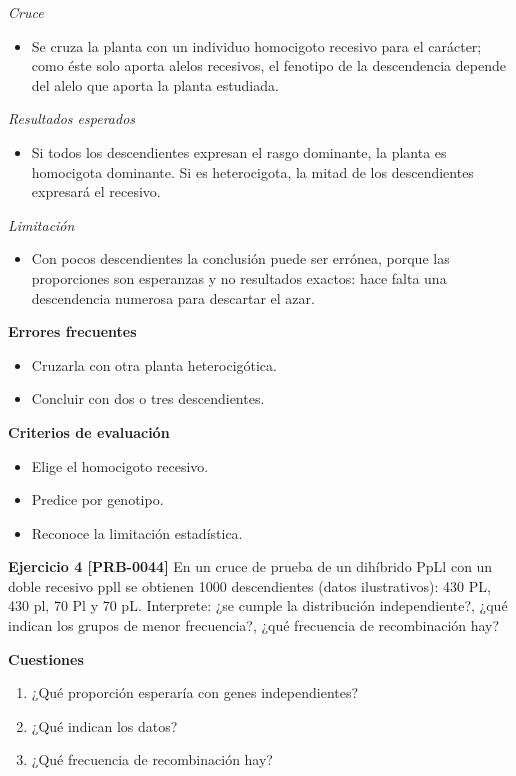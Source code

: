 \documentclass{book}
\begin{document}
\noindent\textit{Cruce}
\begin{itemize}
\item Se cruza la planta con un individuo homocigoto recesivo para el carácter; como éste solo aporta alelos recesivos, el fenotipo de la descendencia depende del alelo que aporta la planta estudiada.
\end{itemize}

\noindent\textit{Resultados esperados}
\begin{itemize}
\item Si todos los descendientes expresan el rasgo dominante, la planta es homocigota dominante. Si es heterocigota, la mitad de los descendientes expresará el recesivo.
\end{itemize}

\noindent\textit{Limitación}
\begin{itemize}
\item Con pocos descendientes la conclusión puede ser errónea, porque las proporciones son esperanzas y no resultados exactos: hace falta una descendencia numerosa para descartar el azar.
\end{itemize}

\noindent\textbf{Errores frecuentes}
\begin{itemize}
\item Cruzarla con otra planta heterocigótica.
\item Concluir con dos o tres descendientes.
\end{itemize}

\noindent\textbf{Criterios de evaluación}
\begin{itemize}
\item Elige el homocigoto recesivo.
\item Predice por genotipo.
\item Reconoce la limitación estadística.
\end{itemize}

\noindent\textbf{Ejercicio 4 [PRB-0044]}
En un cruce de prueba de un dihíbrido PpLl con un doble recesivo ppll se obtienen 1000 descendientes (datos ilustrativos): 430 PL, 430 pl, 70 Pl y 70 pL. Interprete: ¿se cumple la distribución independiente?, ¿qué indican los grupos de menor frecuencia?, ¿qué frecuencia de recombinación hay?


\noindent\textbf{Cuestiones}
\begin{enumerate}
\item ¿Qué proporción esperaría con genes independientes?
\item ¿Qué indican los datos?
\item ¿Qué frecuencia de recombinación hay?
\end{enumerate}
\end{document}
